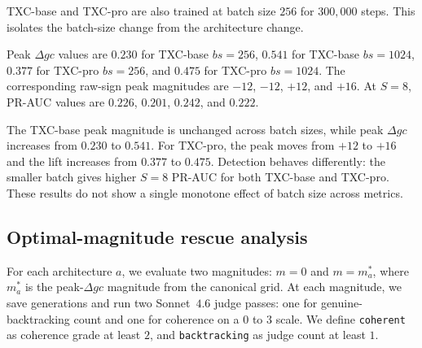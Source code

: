 TXC-base and TXC-pro are also trained at batch size $256$ for $300{,}000$ steps. This isolates the batch-size change from the architecture change.

Peak $\Delta gc$ values are $0.230$ for TXC-base $bs=256$, $0.541$ for TXC-base $bs=1024$, $0.377$ for TXC-pro $bs=256$, and $0.475$ for TXC-pro $bs=1024$. The corresponding raw-sign peak magnitudes are $-12$, $-12$, $+12$, and $+16$. At $S=8$, PR-AUC values are $0.226$, $0.201$, $0.242$, and $0.222$.

The TXC-base peak magnitude is unchanged across batch sizes, while peak $\Delta gc$ increases from $0.230$ to $0.541$. For TXC-pro, the peak moves from $+12$ to $+16$ and the lift increases from $0.377$ to $0.475$. Detection behaves differently: the smaller batch gives higher $S=8$ PR-AUC for both TXC-base and TXC-pro. These results do not show a single monotone effect of batch size across metrics.

\subsection{Optimal-magnitude rescue analysis}
\label{app:c7-optimal-mag}

For each architecture $a$, we evaluate two magnitudes: $m=0$ and $m=m^*_a$, where $m^*_a$ is the peak-$\Delta gc$ magnitude from the canonical grid. At each magnitude, we save generations and run two Sonnet~$4.6$ judge passes: one for genuine-backtracking count and one for coherence on a $0$ to $3$ scale. We define \texttt{coherent} as coherence grade at least $2$, and \texttt{backtracking} as judge count at least $1$.


